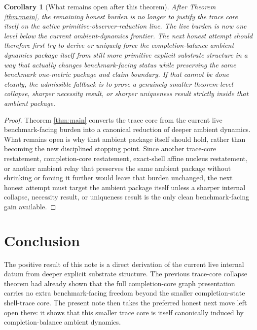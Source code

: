 \documentclass[11pt]{article}
\newtheorem{corollary}{Corollary}
\begin{document}
\begin{corollary}[What remains open after this theorem]
\label{cor:next}
After Theorem \ref{thm:main}, the remaining honest burden is no longer to justify the trace core itself on the active primitive-observer-reduction line. The live burden is now one level below the current ambient-dynamics frontier. The next honest attempt should therefore first try to derive or uniquely force the completion-balance ambient dynamics package itself from still more primitive explicit substrate structure in a way that actually changes benchmark-facing status while preserving the same benchmark one-metric package and claim boundary. If that cannot be done cleanly, the admissible fallback is to prove a genuinely smaller theorem-level collapse, sharper necessity result, or sharper uniqueness result strictly inside that ambient package.
\end{corollary}

\begin{proof}
Theorem \ref{thm:main} converts the trace core from the current live benchmark-facing burden into a canonical reduction of deeper ambient dynamics. What remains open is why that ambient package itself should hold, rather than becoming the new disciplined stopping point. Since another trace-core restatement, completion-core restatement, exact-shell affine nucleus restatement, or another ambient relay that preserves the same ambient package without shrinking or forcing it further would leave that burden unchanged, the next honest attempt must target the ambient package itself unless a sharper internal collapse, necessity result, or uniqueness result is the only clean benchmark-facing gain available.
\end{proof}

\section{Conclusion}

The positive result of this note is a direct derivation of the current live internal datum from deeper explicit substrate structure. The previous trace-core collapse theorem had already shown that the full completion-core graph presentation carries no extra benchmark-facing freedom beyond the smaller completion-state shell-trace core. The present note then takes the preferred honest next move left open there: it shows that this smaller trace core is itself canonically induced by completion-balance ambient dynamics.
\end{document}
